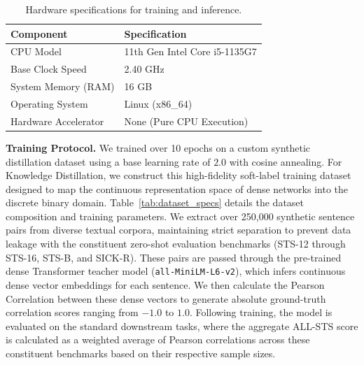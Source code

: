\documentclass[10pt]{article} %
\begin{document}
\begin{table}[t!]
\caption{Hardware specifications for training and inference.}
\label{tab:hardware_specs}
\begin{center}
\begin{tabular}{ll}
\toprule
\textbf{Component} & \textbf{Specification} \\
\midrule
CPU Model & 11th Gen Intel Core i5-1135G7 \\
Base Clock Speed & 2.40 GHz \\
System Memory (RAM) & 16 GB \\
Operating System & Linux (x86\_64) \\
Hardware Accelerator & None (Pure CPU Execution) \\
\bottomrule
\end{tabular}
\end{center}
\end{table}

\textbf{Training Protocol.} We trained over 10 epochs on a custom synthetic distillation dataset using a base learning rate of $2.0$ with cosine annealing. For Knowledge Distillation, we construct this high-fidelity soft-label training dataset designed to map the continuous representation space of dense networks into the discrete binary domain. Table~\ref{tab:dataset_specs} details the dataset composition and training parameters. We extract over 250,000 synthetic sentence pairs from diverse textual corpora, maintaining strict separation to prevent data leakage with the constituent zero-shot evaluation benchmarks (STS-12 through STS-16, STS-B, and SICK-R). These pairs are passed through the pre-trained dense Transformer teacher model (\texttt{all-MiniLM-L6-v2}), which infers continuous dense vector embeddings for each sentence. We then calculate the Pearson Correlation between these dense vectors to generate absolute ground-truth correlation scores ranging from $-1.0$ to $1.0$. Following training, the model is evaluated on the standard downstream tasks, where the aggregate ALL-STS score is calculated as a weighted average of Pearson correlations across these constituent benchmarks based on their respective sample sizes.
\end{document}
